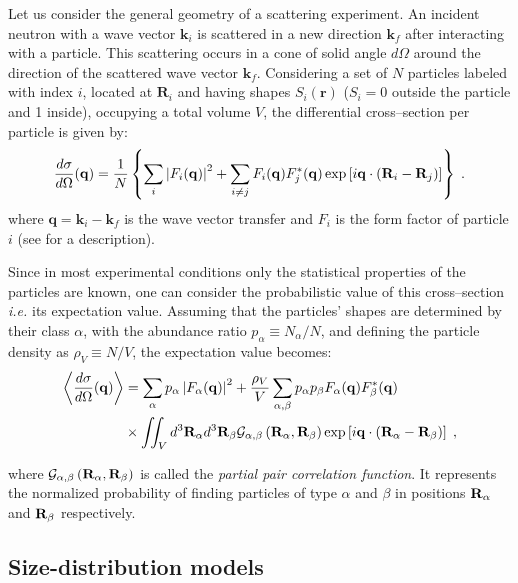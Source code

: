 Let us consider the general geometry of a scattering experiment. An incident neutron with a wave vector $\mathbf{k}_i$ is scattered in a new direction $\mathbf{k}_f$ after interacting with a particle. This scattering occurs in a cone of solid angle $d\Omega$ around the direction of the scattered wave vector $\mathbf{k}_f$.
Considering a set of $N$ particles labeled with index $i$, located at $\mathbf{R}_i$ and having shapes $S_i(\mathbf{r})$ ($S_i=0$ outside the particle and 1 inside), occupying a total volume $V$, the differential cross--section per particle is given by:
\begin{equation*}
  \frac{d\sigma}{d\Omega}(\mathbf{q}) = \frac{1}{N}\left\lbrace \sum_i \left\lvert F_i(\mathbf{q}) \right\rvert ^2 + \sum_{i\neq j} F_i(\mathbf{q}) F_{j}^*(\mathbf{q}) \exp \left[i\mathbf{q}\cdot (\mathbf{R}_i-\mathbf{R}_j)\right] \right\rbrace \; .
\end{equation*}
where  $\mathbf{q}=\mathbf{k}_i - \mathbf{k}_f$ is the wave vector transfer and $F_i$ is the form factor of particle $i$ (see  for a description).


Since in most experimental conditions only the statistical properties of the particles are known, one can consider the probabilistic value of this cross--section \textit{i.e.} its expectation value. Assuming that the particles' shapes are determined by their class $\alpha$, with the abundance ratio $p_\alpha \equiv N_\alpha / N$, and defining the particle density as $\rho_V \equiv N/V$, the expectation value becomes:
\begin{align*}
  \left\langle \frac{d\sigma}{d\Omega}(\mathbf{q}) \right\rangle  & = \sum_\alpha p_\alpha \left\lvert F_\alpha(\mathbf{q})\right\rvert ^2 + \frac{\rho_V}{V}\sum_{\alpha,\beta} p_\alpha p_\beta F_\alpha (\mathbf{q})F_\beta^*(\mathbf{q})  \\
  & \times \iint_V d^3\mathbf{R}_\alpha d^3\mathbf{R}_\beta \mathcal{G}_{\alpha ,\beta}\left( \mathbf{R}_{\alpha} , \mathbf{R}_{\beta} \right) \exp \left[ i\mathbf{q}\cdot (\mathbf{R}_\alpha - \mathbf{R}_\beta ) \right] \; ,
\end{align*}

where $\mathcal{G}_{\alpha ,\beta}\left( \mathbf{R}_{\alpha} , \mathbf{R}_{\beta} \right)$ is called the \emph{partial pair correlation function}. It represents the normalized probability of finding particles of type $\alpha$ and $\beta$ in positions $\mathbf{R}_\alpha$ and $\mathbf{R}_\beta$ respectively. 

\subsection{Size-distribution models}


